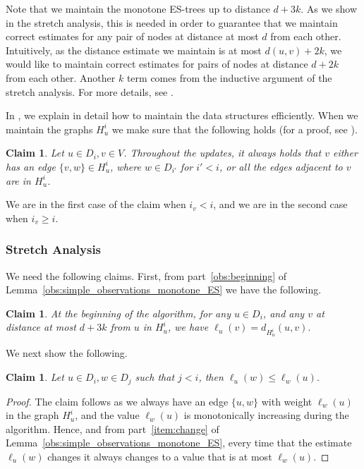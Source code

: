 \documentclass[11pt]{article}
\newtheorem{claim}[theorem]{Claim}
\theoremstyle{definition}
\theoremstyle{remark}
\begin{document}
Note that we maintain the monotone ES-trees up to distance $d+3k$. As we show in the stretch analysis, this is needed in order to guarantee that we maintain correct estimates for any pair of nodes at distance at most $d$ from each other. Intuitively, as the distance estimate we maintain is at most $d(u,v)+2k$, we would like to maintain correct estimates for pairs of nodes at distance $d+2k$ from each other. Another $k$ term comes from the inductive argument of the stretch analysis. For more details, see .

In , we explain in detail how to maintain the data structures efficiently. When we maintain the graphs $H_u^i$ we make sure that the following holds (for a proof, see ). 

\begin{claim}\label{claim_Hui}
Let $u \in D_i, v \in V$. Throughout the updates, it always holds that $v$ either has an edge $\{v,w\} \in H_u^i$, where $w \in D_{i'}$ for $i' < i$, or all the edges adjacent to $v$ are in $H_u^i$. 
\end{claim}

We are in the first case of the claim when $i_v <i$, and we are in the second case when $i_v \geq i$.

\subsubsection{Stretch Analysis} \label{sec_additive_stretch}

We need the following claims. First, from part~\ref{obs:beginning} of Lemma~\ref{obs:simple_observations_monotone_ES} we have the following.

\begin{claim} \label{claim_beginning}
At the beginning of the algorithm, for any $u \in D_i$, and any $v$ at distance at most $d+3k$ from $u$ in $H_u^i$, we have $\ell_u(v)=d_{H_u^i}(u,v).$
\end{claim}

We next show the following. 

\begin{claim} \label{claim_dist_smaller_dom}
Let $u \in D_i, w \in D_j$ such that $j < i$, then $\ell_u(w) \leq \ell_w(u)$. 
\end{claim}

\begin{proof}
The claim follows as we always have an edge $\{u,w\}$ with weight $\ell_w(u)$ in the graph $H_u^i$, and the value $\ell_w(u)$ is monotonically increasing during the algorithm. Hence, and from part~\ref{item:change} of Lemma~\ref{obs:simple_observations_monotone_ES},  every time that the estimate $\ell_u(w)$ changes it always changes to a value that is at most $\ell_w(u)$.
\end{proof}
\end{document}
